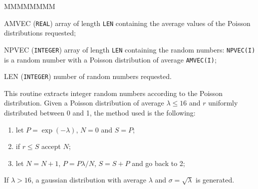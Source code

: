 
\begin{DLtt}{MMMMMMMM}
\item[AMVEC] ({\tt REAL}) array of length {\tt LEN} containing the average
values of the Poisson distributions requested;
\item[NPVEC] ({\tt INTEGER}) array of length {\tt LEN} containing the random
numbers: {\tt NPVEC(I)} is a random number with a Poisson distribution of
average {\tt AMVEC(I)};
\item[LEN] ({\tt INTEGER}) number of random numbers requested.
\end{DLtt}

This routine extracts integer random numbers according to the
Poisson distribution. Given a Poisson distribution of average $\lambda \leq 16$
and $r$ uniformly distributed between 0 and 1, the method used is the 
following:
\begin{enumerate}
\item let $P = \exp(-\lambda)$, $N=0$ and $S=P$;
\item if $r\leq S$ accept $N$;
\item let $N=N+1$, $P=P \lambda/N$, $S=S+P$ and go back to 2;
\end{enumerate}

If $\lambda > 16$, a gaussian distribution with average $\lambda$ and 
$\sigma = \sqrt{\lambda}$ is generated.
